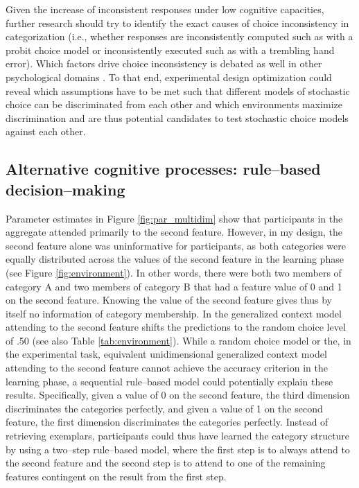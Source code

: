 \documentclass[a4paper,man,natbib]{apa6}
\begin{document}
Given the increase of inconsistent responses under low cognitive capacities, further research should try to identify the exact causes of choice inconsistency in categorization (i.e., whether responses are inconsistently computed such as with a probit choice model or inconsistently executed such as with a trembling hand error). Which factors drive choice inconsistency is debated as well in other psychological domains \citep{blavatskyy2010models}. To that end, experimental design optimization \citep{myung2004model} could reveal which assumptions have to be met such that different models of stochastic choice can be discriminated from each other and which environments maximize discrimination and are thus potential candidates to test stochastic choice models against each other.

\subsection{Alternative cognitive processes: rule--based decision--making}
Parameter estimates in Figure \ref{fig:par_multidim} show that participants in the aggregate attended primarily to the second feature. However, in my design, the second feature alone was uninformative for participants, as both categories were equally distributed across the values of the second feature in the learning phase (see Figure \ref{fig:environment}). In other words, there were both two members of category A and two members of category B that had a feature value of 0 and 1 on the second feature. Knowing the value of the second feature gives thus by itself no information of category membership. In the generalized context model attending to the second feature shifts the predictions to the random choice level of .50 (see also Table \ref{tab:environment}). 
While a random choice model or the, in the experimental task, equivalent unidimensional generalized context model attending to the second feature cannot achieve the accuracy criterion in the learning phase, a sequential rule--based model could potentially explain these results. Specifically, given a value of 0 on the second feature, the third dimension discriminates the categories perfectly, and given a value of 1 on the second feature, the first dimension discriminates the categories perfectly. Instead of retrieving exemplars, participants could thus have learned the category structure by using a two--step rule--based model, where the first step is to always attend to the second feature and the second step is to attend to one of the remaining features contingent on the result from the first step.
\end{document}
